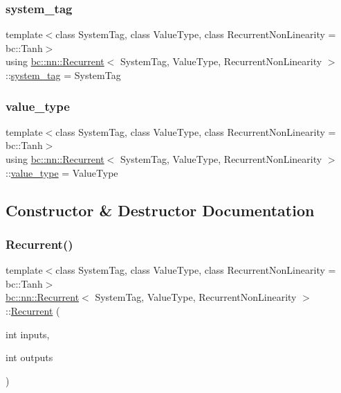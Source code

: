 \subsubsection{\texorpdfstring{system\+\_\+tag}{system\_tag}}
{\footnotesize\ttfamily template$<$class System\+Tag, class Value\+Type, class Recurrent\+Non\+Linearity = bc\+::\+Tanh$>$ \\
using \hyperlink{structbc_1_1nn_1_1Recurrent}{bc\+::nn\+::\+Recurrent}$<$ System\+Tag, Value\+Type, Recurrent\+Non\+Linearity $>$\+::\hyperlink{structbc_1_1nn_1_1Recurrent_a4342e7f5393c7fa645eb4f314a762906}{system\+\_\+tag} =  System\+Tag}

\mbox{\label{structbc_1_1nn_1_1Recurrent_a63e637ac6714329732170ad23e7b1b67}} 
\subsubsection{\texorpdfstring{value\+\_\+type}{value\_type}}
{\footnotesize\ttfamily template$<$class System\+Tag, class Value\+Type, class Recurrent\+Non\+Linearity = bc\+::\+Tanh$>$ \\
using \hyperlink{structbc_1_1nn_1_1Recurrent}{bc\+::nn\+::\+Recurrent}$<$ System\+Tag, Value\+Type, Recurrent\+Non\+Linearity $>$\+::\hyperlink{structbc_1_1nn_1_1Recurrent_a63e637ac6714329732170ad23e7b1b67}{value\+\_\+type} =  Value\+Type}



\subsection{Constructor \& Destructor Documentation}
\mbox{\label{structbc_1_1nn_1_1Recurrent_a0c8df4208c137ac0b1c940a80daf0c45}} 
\subsubsection{\texorpdfstring{Recurrent()}{Recurrent()}}
{\footnotesize\ttfamily template$<$class System\+Tag, class Value\+Type, class Recurrent\+Non\+Linearity = bc\+::\+Tanh$>$ \\
\hyperlink{structbc_1_1nn_1_1Recurrent}{bc\+::nn\+::\+Recurrent}$<$ System\+Tag, Value\+Type, Recurrent\+Non\+Linearity $>$\+::\hyperlink{structbc_1_1nn_1_1Recurrent}{Recurrent} (\begin{DoxyParamCaption}\item[{int}]{inputs,  }\item[{int}]{outputs }\end{DoxyParamCaption})\hspace{0.3cm}{\ttfamily [inline]}}



